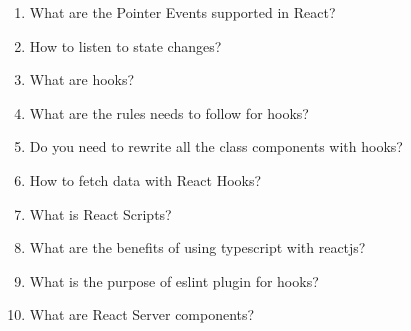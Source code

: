 \documentclass[11pt]{article}
\begin{document}
\begin{enumerate}
\item What are the Pointer Events supported in React?
\item How to listen to state changes?
\item What are hooks?
\item What are the rules needs to follow for hooks?
\item Do you need to rewrite all the class components with hooks?
\item How to fetch data with React Hooks?
\item What is React Scripts?
\item What are the benefits of using typescript with reactjs?
\item What is the purpose of eslint plugin for hooks?
\item What are React Server components?
\end{enumerate}
\end{document}

